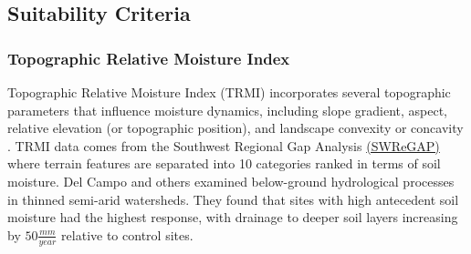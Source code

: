 \documentclass[
  number,
  preprint,
  3p,
  onecolumn]{elsarticle}
\begin{document}
\subsection{Suitability Criteria}\label{suitability-criteria}

\subsubsection{Topographic Relative Moisture
Index}\label{topographic-relative-moisture-index}

Topographic Relative Moisture Index (TRMI) incorporates several
topographic parameters that influence moisture dynamics, including slope
gradient, aspect, relative elevation (or topographic position), and
landscape convexity or concavity \citep{parker1982}. TRMI data comes
from the Southwest Regional Gap Analysis
\href{https://swregap.org/data/}{(SWReGAP)} where terrain features are
separated into 10 categories ranked in terms of soil moisture. Del Campo
and others \citep{del_campo_effectiveness_2019} examined below-ground
hydrological processes in thinned semi-arid watersheds. They found that
sites with high antecedent soil moisture had the highest response, with
drainage to deeper soil layers increasing by \(50\frac{mm}{year}\)
relative to control sites.
\end{document}
